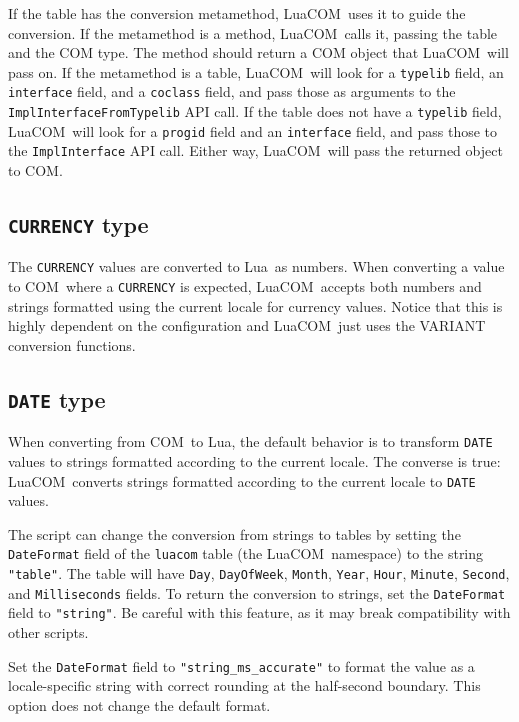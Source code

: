 \documentclass[11pt,a4paper,english]{report}
\newcommand{\ident}[1]{\mbox{\texttt{#1}}}
\newcommand{\techname}[1]{\mbox{#1}}
\newcommand{\lua}{\techname{Lua}}
\newcommand{\com}{\techname{COM}}
\newcommand{\luacom}{\techname{LuaCOM}}
\begin{document}
If the table has the conversion metamethod, \luacom\ uses it
to guide the conversion. If the metamethod is a method, \luacom\
calls it, passing the table and the COM type. The method should return a COM object
that \luacom\ will pass on. If the metamethod is a table, \luacom\ will
look for a \verb+typelib+ field, an \verb+interface+ field, and a \verb+coclass+ field,
and pass those as arguments to the \verb+ImplInterfaceFromTypelib+ API call. If the table
does not have a \verb+typelib+ field, \luacom\ will look for a \verb+progid+ field and
an \verb+interface+ field, and pass those to the \verb+ImplInterface+ API call. Either way,
\luacom\ will pass the returned object to COM.

\subsection{\ident{CURRENCY} type}
The \ident{CURRENCY} values are converted to \lua\ as numbers. When
converting a value to \com\ where a \ident{CURRENCY} is expected,
\luacom\ accepts both numbers and strings formatted using the current
locale for currency values. Notice that this is highly dependent on
the configuration and \luacom\ just uses the VARIANT conversion
functions.

\subsection{\ident{DATE} type}

When converting from \com\ to \lua, the default behavior is to transform \ident{DATE}
values to strings formatted according to the current locale. The
converse is true: \luacom\ converts strings formatted according to the
current locale to \ident{DATE} values.

The script can change the conversion from strings to tables by
setting the \verb+DateFormat+ field of the \verb+luacom+ table (the
\luacom\ namespace) to the string \verb+"table"+. The table will
have \verb+Day+, \verb+DayOfWeek+, \verb+Month+, \verb+Year+,
\verb+Hour+, \verb+Minute+, \verb+Second+, and \verb+Milliseconds+
fields. To return the conversion to strings, set the
\verb+DateFormat+ field to \verb+"string"+. Be careful with this
feature, as it may break compatibility with other scripts.

Set the \verb+DateFormat+ field to \verb+"string_ms_accurate"+ to
format the value as a locale-specific string with correct rounding at
the half-second boundary. This option does not change the default format.
\end{document}
